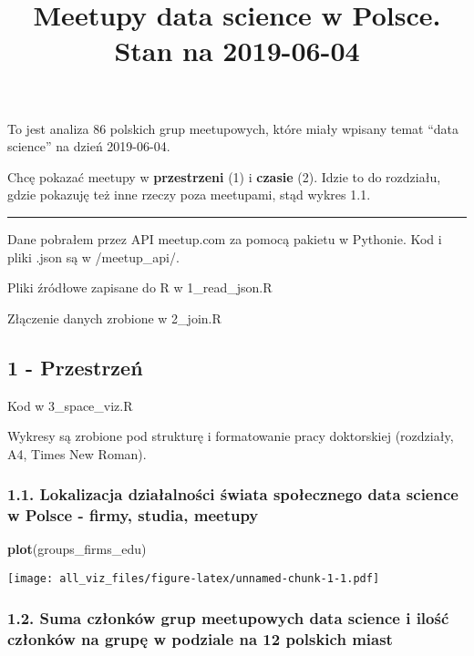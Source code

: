 \documentclass[]{article}
\title{Meetupy data science w Polsce. Stan na 2019-06-04}
\author{}
\date{}
\newenvironment{Shaded}{\begin{snugshade}}{\end{snugshade}}
\newcommand{\KeywordTok}[1]{\textcolor[rgb]{0.13,0.29,0.53}{\textbf{#1}}}
\newcommand{\NormalTok}[1]{#1}
\begin{document}
\maketitle

To jest analiza 86 polskich grup meetupowych, które miały wpisany temat
``data science'' na dzień 2019-06-04.

Chcę pokazać meetupy w \textbf{przestrzeni} (1) i \textbf{czasie} (2).
Idzie to do rozdziału, gdzie pokazuję też inne rzeczy poza meetupami,
stąd wykres 1.1.

\begin{center}\rule{0.5\linewidth}{\linethickness}\end{center}

Dane pobrałem przez API meetup.com za pomocą pakietu w Pythonie. Kod i
pliki .json są w /meetup\_api/.

Pliki źródłowe zapisane do R w 1\_read\_json.R

Złączenie danych zrobione w 2\_join.R

\hypertarget{przestrzen}{%
\subsection{1 - Przestrzeń}\label{przestrzen}}

Kod w 3\_space\_viz.R

Wykresy są zrobione pod strukturę i formatowanie pracy doktorskiej
(rozdziały, A4, Times New Roman).

\hypertarget{lokalizacja-dziaalnosci-swiata-spoecznego-data-science-w-polsce---firmy-studia-meetupy}{%
\subsubsection{1.1. Lokalizacja działalności świata społecznego data
science w Polsce - firmy, studia,
meetupy}\label{lokalizacja-dziaalnosci-swiata-spoecznego-data-science-w-polsce---firmy-studia-meetupy}}

\begin{Shaded}
\begin{Highlighting}[]
\KeywordTok{plot}\NormalTok{(groups_firms_edu)}
\end{Highlighting}
\end{Shaded}

\texttt{[image: all\_viz\_files/figure-latex/unnamed-chunk-1-1.pdf]}

\hypertarget{suma-czonkow-grup-meetupowych-data-science-i-ilosc-czonkow-na-grupe-w-podziale-na-12-polskich-miast}{%
\subsubsection{1.2. Suma członków grup meetupowych data science i ilość
członków na grupę w podziale na 12 polskich
miast}\label{suma-czonkow-grup-meetupowych-data-science-i-ilosc-czonkow-na-grupe-w-podziale-na-12-polskich-miast}}
\end{document}
